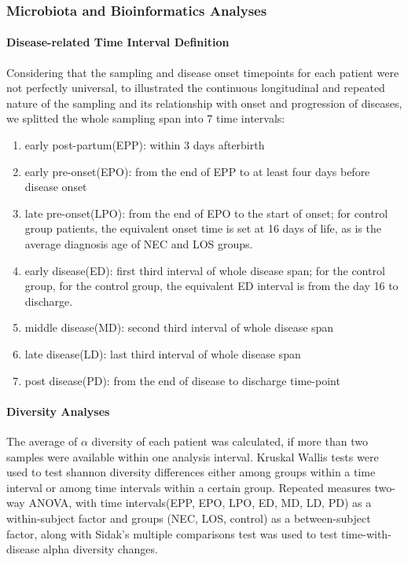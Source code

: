 \documentclass[fleqn,10pt]{wlpeerj} %
\begin{document}
    \subsubsection*{Microbiota and Bioinformatics Analyses}
      \paragraph*{Disease-related Time Interval Definition}
      Considering that the sampling and disease onset timepoints for each patient were not perfectly universal, to illustrated the continuous longitudinal and repeated nature of the sampling and its relationship with onset and progression of diseases, we splitted the whole sampling span into 7 time intervals:
        \begin{enumerate}[noitemsep]
          \item early post-partum(EPP): within 3 days afterbirth
          \item early pre-onset(EPO): from the end of EPP to at least four days before disease onset
          \item late pre-onset(LPO): from the end of EPO to the start of onset; for control group patients, the equivalent onset time is set at 16 days of life, as is the average diagnosis age of NEC and LOS groups.
          \item early disease(ED): first third interval of whole disease span; for the control group, for the control group, the equivalent ED interval is from the day 16  to discharge.
          \item middle disease(MD): second third interval of whole disease span
          \item late disease(LD): last third interval of whole disease span
          \item post disease(PD): from the end of disease to discharge time-point
        \end{enumerate}
      \paragraph{Diversity Analyses}
      The average of $\alpha$  diversity of each patient was calculated, if more than two samples were available within one analysis interval. Kruskal Wallis tests were used to test shannon diversity differences either among groups within a time interval or among time intervals within a certain group. Repeated measures two-way ANOVA, with time intervals(EPP, EPO, LPO, ED, MD, LD, PD) as a within-subject factor and groups (NEC, LOS, control) as a between-subject factor, along with Sidak’s multiple comparisons test was used to test time-with-disease alpha diversity changes.
\end{document}
